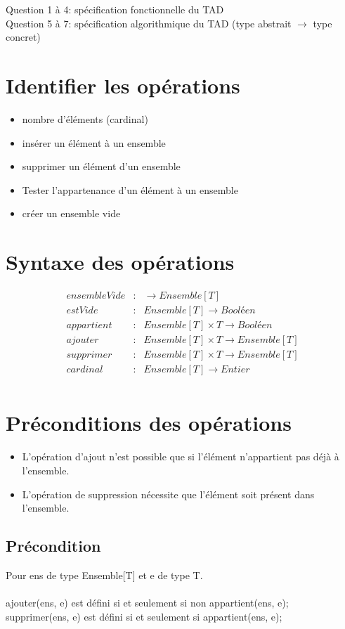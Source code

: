 \documentclass{slides}
\title{}
\date{TAD\\ Semestre 2}
\begin{document}
	\maketitle
	Question 1 à 4: spécification fonctionnelle du TAD\\
	Question 5 à 7: spécification algorithmique du TAD 
			(type abstrait $\rightarrow$ type concret)

	\section{Identifier les opérations}
		\begin{itemize}
			\item nombre d'éléments (cardinal)
			\item insérer un élément à un ensemble
			\item supprimer un élément d'un ensemble
			\item Tester l'appartenance d'un élément à un ensemble
			\item créer un ensemble vide
		\end{itemize}
	\section{Syntaxe des opérations}
		\begin{eqnarray*}
			ensembleVide&:& \rightarrow Ensemble[T] \\
			estVide&:& Ensemble[T] \rightarrow Booléen\\ 
			appartient&:& Ensemble[T] \times T \rightarrow Booléen \\
			ajouter&:& Ensemble[T] \times T \rightarrow Ensemble[T]\\
			supprimer&:& Ensemble[T] \times T \rightarrow Ensemble[T]\\
			cardinal&:& Ensemble[T] \rightarrow Entier\\
		\end{eqnarray*}
	 \section{Préconditions des opérations}
	 \begin{itemize}
		\item L'opération d'ajout n'est possible que si l'élément n'appartient
		pas déjà à l'ensemble.
		\item L'opération de suppression nécessite que l'élément soit présent
		dans l'ensemble.
	\end{itemize}	
	\subsection{Précondition}
	Pour ens de type Ensemble[T] et e de type T.\\ \\
		ajouter(ens, e) est défini si et seulement si non appartient(ens, e);\\
		supprimer(ens, e) est défini si et seulement si appartient(ens, e);\\
\end{document}
